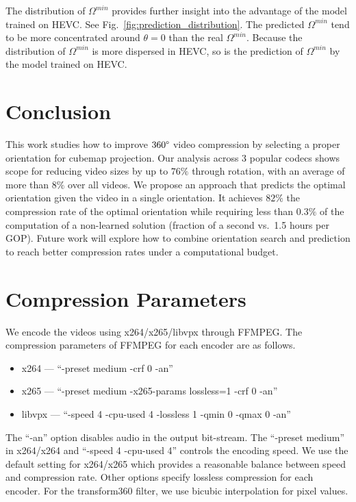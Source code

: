 \documentclass[journal,transmag]{IEEEtran}
\begin{document}
The distribution of $\Omega^{min}$ provides further insight into the advantage of the model trained on HEVC.
See Fig.~\ref{fig:prediction_distribution}.
The predicted $\Omega^{min}$ tend to be more concentrated around $\theta{=}0$ than the real $\Omega^{min}$.
Because the distribution of $\Omega^{min}$ is more dispersed in HEVC,
so is the prediction of $\Omega^{min}$ by the model trained on HEVC.



\section{Conclusion}


This work studies how to improve $360\degree$ video compression by selecting a proper orientation for cubemap projection.
Our analysis across 3 popular codecs shows scope for reducing video sizes by up to $76\%$ through rotation,
with an average of more than $8\%$ over all videos.
We propose an approach that predicts the optimal orientation given the video in a single orientation.
It achieves $82\%$ the compression rate of the optimal orientation while requiring less than $0.3\%$ of the computation of a non-learned solution (fraction of a second vs.~1.5 hours per GOP).
Future work will explore how to combine orientation search and prediction to reach better compression rates under a computational budget.






\IEEEpeerreviewmaketitle




\appendices
\section{Compression Parameters}

We encode the videos using x264/x265/libvpx through FFMPEG.
The compression parameters of FFMPEG for each encoder are as follows.
\begin{itemize}[leftmargin=*,label=$\bullet$]
    \item x264 --- ``-preset medium -crf 0 -an''
    \item x265 --- ``-preset medium -x265-params lossless=1 -crf 0 -an''
    \item libvpx --- ``-speed 4 -cpu-used 4 -lossless 1 -qmin 0 -qmax 0 -an''
\end{itemize}
The ``-an'' option disables audio in the output bit-stream.
The ``-preset medium'' in x264/x264 and ``-speed 4 -cpu-used 4'' controls the encoding speed.
We use the default setting for x264/x265 which provides a reasonable balance between speed and compression rate.
Other options specify lossless compression for each encoder.
For the transform360 filter,
we use bicubic interpolation for pixel values.
\end{document}

